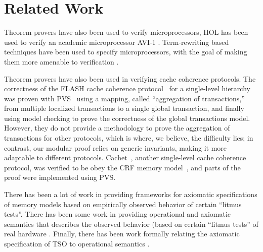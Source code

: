 \section{Related Work}
\label{relatedWork}



Theorem provers have also been used to verify microprocessors, \eg{} HOL has been
used to verify an academic microprocessor AVI-1 \cite{windley1995formal}.
Term-rewriting based techniques have been used to specify microprocessors, with
the goal of making them more amenable to verification \cite{shen1999using}.

Theorem provers have also been used in verifying cache coherence protocols.
The correctness of the FLASH cache coherence protocol~\cite{flash} for a
single-level hierarchy was proven with PVS~\cite{park} using a mapping, called
``aggregation of transactions,'' from multiple localized transactions to a
single global transaction, and finally using model checking to prove the correctness of
the global transactions model. However, they do not provide a methodology to
prove the aggregation of transactions for other protocols, which is where, we
believe, the difficulty lies; in contrast, our modular proof relies on generic
invariants, making it more adaptable to different protocols.
Cachet~\cite{StoyShenArvind:Proofs}, another single-level cache coherence
protocol, was verified to be obey the CRF memory
model~\cite{Shen:CRF}, and parts of the proof were implemented using PVS.


There has been a lot of work in providing frameworks for axiomatic
specifications of memory models based on empirically observed behavior of
certain ``litmus
tests''\cite{Alglave11,Alglave:FMSD,alglave2012formal,Alglave:2010,Alglave:TACAS,alglave2014herding}.
There has been some work in providing operational and axiomatic semantics that
describes the observed behavior (based on certain ``litmus tests'' of real
hardware
\cite{mador2012axiomatic,sarkar2011understanding,sarkar2012synchronising}.
Finally, there has been work formally relating the axiomatic specification of
TSO to operational semantics \cite{x86tsocacm10}.

